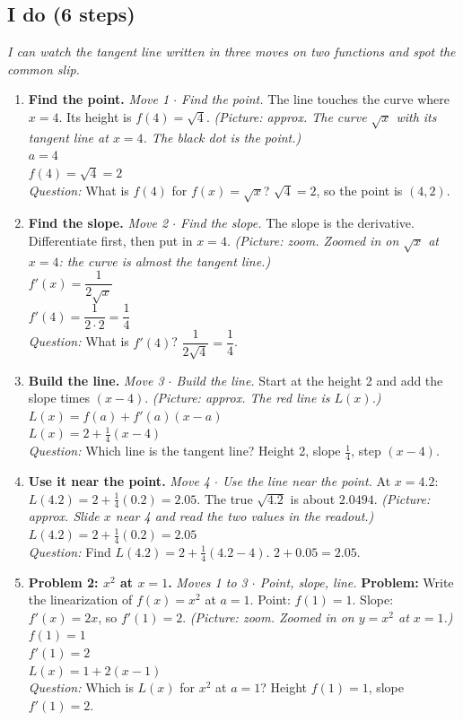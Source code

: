 \documentclass[11pt]{article}
\begin{document}
\subsection*{I do (6 steps)}
\textit{I can watch the tangent line written in three moves on two functions and spot the common slip.}\par
\begin{enumerate}
\item \textbf{Find the point.} \textit{Move 1 $\cdot$ Find the point.} The line touches the curve where $x=4$. Its height is $f(4)=\sqrt4$. \textit{(Picture: approx. The curve $\sqrt{x}$ with its tangent line at $x=4$. The black dot is the point.)}\\ $a=4$\\ $f(4)=\sqrt4=2$\\ \textit{Question:} What is $f(4)$ for $f(x)=\sqrt{x}$?  $\sqrt4=2$, so the point is $(4,2)$.
\item \textbf{Find the slope.} \textit{Move 2 $\cdot$ Find the slope.} The slope is the derivative. Differentiate first, then put in $x=4$. \textit{(Picture: zoom. Zoomed in on $\sqrt{x}$ at $x=4$: the curve is almost the tangent line.)}\\ $f'(x)=\dfrac{1}{2\sqrt{x}}$\\ $f'(4)=\dfrac{1}{2\cdot2}=\dfrac14$\\ \textit{Question:} What is $f'(4)$?  $\dfrac{1}{2\sqrt4}=\dfrac{1}{4}$.
\item \textbf{Build the line.} \textit{Move 3 $\cdot$ Build the line.} Start at the height 2 and add the slope times $(x-4)$. \textit{(Picture: approx. The red line is $L(x)$.)}\\ $L(x)=f(a)+f'(a)(x-a)$\\ $L(x)=2+\tfrac14(x-4)$\\ \textit{Question:} Which line is the tangent line?  Height 2, slope $\tfrac14$, step $(x-4)$.
\item \textbf{Use it near the point.} \textit{Move 4 $\cdot$ Use the line near the point.} At $x=4.2$: $L(4.2)=2+\tfrac14(0.2)=2.05$. The true $\sqrt{4.2}$ is about $2.0494$. \textit{(Picture: approx. Slide $x$ near 4 and read the two values in the readout.)}\\ $L(4.2)=2+\tfrac14(0.2)=2.05$\\ \textit{Question:} Find $L(4.2)=2+\tfrac14(4.2-4)$.  $2+0.05=2.05$.
\item \textbf{Problem 2: $x^2$ at $x=1$.} \textit{Moves 1 to 3 $\cdot$ Point, slope, line.} \textbf{Problem:} Write the linearization of $f(x)=x^2$ at $a=1$. Point: $f(1)=1$. Slope: $f'(x)=2x$, so $f'(1)=2$. \textit{(Picture: zoom. Zoomed in on $y=x^2$ at $x=1$.)}\\ $f(1)=1$\\ $f'(1)=2$\\ $L(x)=1+2(x-1)$\\ \textit{Question:} Which is $L(x)$ for $x^2$ at $a=1$?  Height $f(1)=1$, slope $f'(1)=2$.

\end{enumerate}
\end{document}
